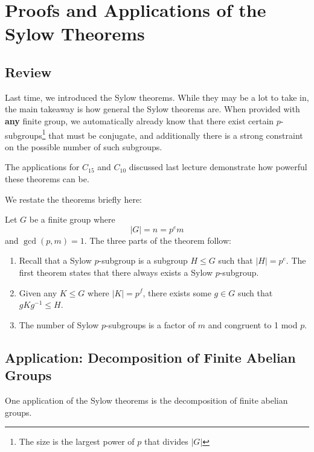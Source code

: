 
\section{Proofs and Applications of the Sylow Theorems}
\subsection{Review}
Last time, we introduced the Sylow theorems. While they may be a lot to take in, the main takeaway is how general the Sylow theorems are. When provided with \textbf{any} finite group, we automatically already know that there exist certain $p$-subgroups\footnote{The size is the largest power of $p$ that divides $|G|$} that must be conjugate, and additionally there is a strong constraint on the possible number of such subgroups.

The applications for $C_{15}$ and $C_{10}$ discussed last lecture demonstrate how powerful these theorems can be.

We restate the theorems briefly here:
\begin{theorem}
    Let $G$ be a finite group where \[|G| = n = p^em\] and $\gcd(p, m) =1$. The three parts of the theorem follow:
    \begin{enumerate}
        \item 
            Recall that a Sylow $p$-subgroup is a subgroup $H \leq G$ such that $|H| = p^e$. The first theorem states that there always exists a Sylow $p$-subgroup.
        \item 
            Given any $K \leq G$  where $|K| = p^f$, there exists some $g\in G$ such that $gKg^{-1} \leq H$.
        \item 
            The number of Sylow $p$-subgroups is a factor of $m$ and congruent to 1 mod $p$.
    \end{enumerate}
\end{theorem}

\subsection{Application: Decomposition of Finite Abelian Groups}
One application of the Sylow theorems is the decomposition of finite abelian groups. 

